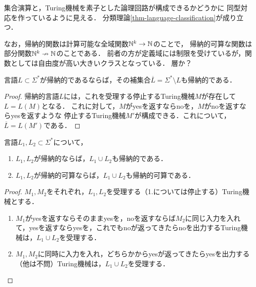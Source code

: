 \documentclass[uplatex, dvipdfmx]{jsreport}
\begin{document}
\begin{tcolorbox}[colframe=ForestGreen, colback=ForestGreen!10!white, breakable]
    集合演算と，Turing機械を素子とした論理回路が構成できるかどうかに
    同型対応を作っているように見える．
    分類理論\ref{thm-language-classification}が成り立つ．

    なお，帰納的関数は計算可能な全域関数$\mathbb{N}^k\to\mathbb{N}$のことで，
    帰納的可算な関数は部分関数$\mathbb{N}^k\nrightarrow\mathbb{N}$のことである．
    前者の方が定義域には制限を受けているが，関数としては自由度が高い大きいクラスとなっている．
    層か？
\end{tcolorbox}

\begin{proposition}[補集合も帰納的]\label{prop-recursive-propagation-over-complement}
    言語$L\subset\Sigma^*$が帰納的であるならば，その補集合$\overline{L}=\Sigma^*\setminus L$も帰納的である．
\end{proposition}
\begin{proof}
    帰納的言語$L$には，これを受理する停止するTuring機械$M$が存在して$L=L(M)$となる．
    これに対して，$M$がyesを返すならnoを，$M$がnoを返すならyesを返すような
    停止するTuring機械$M'$が構成できる．これについて，$\overline{L}=L(M')$である．
\end{proof}

\begin{proposition}[合併も帰納的（可算）]
    言語$L_1,L_2\subset\Sigma^*$について，
    \begin{enumerate}
        \item $L_1,L_2$が帰納的ならば，$L_1\cup L_2$も帰納的である．
        \item $L_1,L_2$が帰納的可算ならば，$L_1\cup L_2$も帰納的可算である．
    \end{enumerate}
\end{proposition}
\begin{proof}
    $M_1,M_2$をそれぞれ，$L_1,L_2$を受理する（1.については停止する）Turing機械とする．
    \begin{enumerate}
        \item $M_1$がyesを返すならそのままyesを，noを返すならば$M_2$に同じ入力を入れて，yesを返すならyesを，これでもnoが返ってきたらnoを出力するTuring機械は，$L_1\cup L_2$を受理する．
        \item $M_1,M_2$に同時に入力を入れ，どちらかからyesが返ってきたらyesを出力する（他は不問）Turing機械は，$L_1\cup L_2$を受理する．
    \end{enumerate}
\end{proof}
\end{document}
